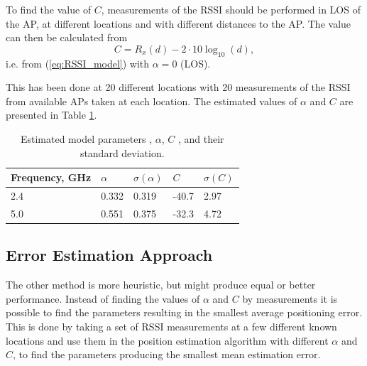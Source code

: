 \documentclass{LTHthesis}
\begin{document}
To find the value of $C$, measurements of the RSSI should be performed in LOS of the AP, at different locations and with different distances to the AP. The value can then be calculated from
%
\begin{equation}
C=R_x(d) - 2\cdot10\log_{10}(d),
\end{equation}
% 
i.e. from (\ref{eq:RSSI_model}) with $\alpha = 0$ (LOS).

This has been done at 20 different locations with 20 measurements of the RSSI from available APs taken at each location. The estimated values of $\alpha$ and $C$ are presented in Table \ref{table:est_par}.

\begin{table}[!hbt]
\begin{center}
\begin{tabular}{|l|l|l|l|l|}
\hline
\multicolumn{1}{|c|}{Frequency, GHz} & $\alpha$ & $\sigma(\alpha)$ & $C$ & $\sigma(C)$ \\
\hline
\hline
2.4 & 0.332 & 0.319 & -40.7 & 2.97 \\
5.0 & 0.551 & 0.375 & -32.3 & 4.72  \\
\hline
\end{tabular}
\end{center}
\caption{Estimated model parameters , $\alpha$, $C$ , and their standard deviation.}\label{table:est_par}
\end{table}
%
\subsection{Error Estimation Approach}
The other method is more heuristic, but might produce equal or better performance. Instead of finding the values of $\alpha$ and $C$ by measurements it is possible to find the parameters resulting in the smallest average positioning error. This is done by taking a set of RSSI measurements at a few different known locations and use them in the position estimation algorithm with different $\alpha$ and $C$, to find the parameters producing the smallest mean estimation error.   
\end{document}
